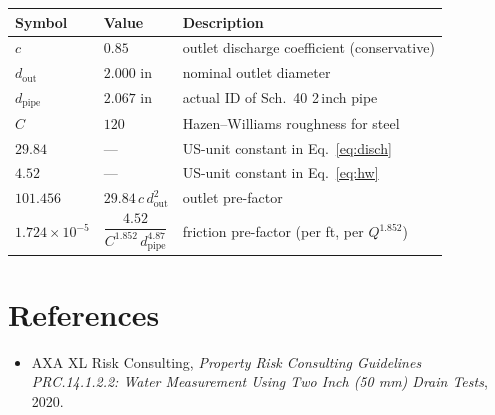 \documentclass[11pt]{article}
\begin{document}
\begin{center}
\begin{tabular}{lll}
\toprule
Symbol & Value & Description \\
\midrule
$c$         & $0.85$            & outlet discharge coefficient (conservative) \\
$d_{\text{out}}$ & $2.000$ in   & nominal outlet diameter \\
$d_{\text{pipe}}$ & $2.067$ in  & actual ID of Sch.~40 2\,inch pipe \\
$C$         & $120$             & Hazen--Williams roughness for steel \\
$29.84$     & ---               & US-unit constant in Eq.~\eqref{eq:disch} \\
$4.52$      & ---               & US-unit constant in Eq.~\eqref{eq:hw} \\
$101.456$   & $29.84\,c\,d_{\text{out}}^{2}$ & outlet pre-factor \\
$1.724\times10^{-5}$ & $\dfrac{4.52}{C^{1.852}\,d_{\text{pipe}}^{4.87}}$ & friction pre-factor (per ft, per $Q^{1.852}$) \\
\bottomrule
\end{tabular}
\end{center}

\section*{References}

\begin{itemize}
  \item AXA XL Risk Consulting, \emph{Property Risk Consulting Guidelines
        PRC.14.1.2.2: Water Measurement Using Two Inch (50 mm) Drain
        Tests}, 2020.
\end{itemize}
\end{document}
